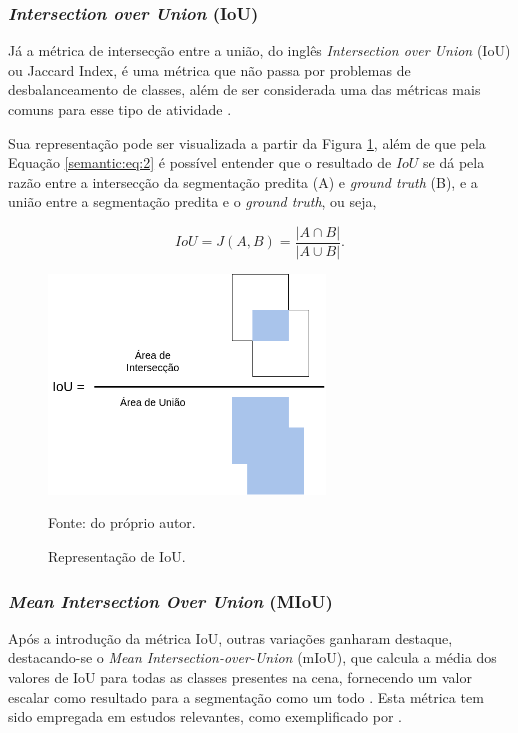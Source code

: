 \subsubsection{\textit{Intersection over Union} (IoU)}
\label{semantic:IoU}
Já a métrica de intersecção entre a união, do inglês \textit{Intersection over Union} (IoU) ou Jaccard Index, é uma métrica que não passa por problemas de desbalanceamento de classes, além de ser considerada uma das métricas mais comuns para esse tipo de atividade \citep{Minaee2021}.

Sua representação pode ser visualizada a partir da Figura \ref{semantic:fig:1}, além de que pela Equação \ref{semantic:eq:2} é possível entender que o resultado de $IoU$ se dá pela razão entre a intersecção da segmentação predita (A) e \textit{ground truth} (B), e a união entre a segmentação predita e o \textit{ground truth}, ou seja,

\begin{equation}
    \label{semantic:eq:2}
    IoU = J(A,B) = \frac{|A \cap B|}{|A \cup B|}.
\end{equation}

\begin{figure}[H]
    \centering
    \caption{Representação de IoU.}
    \includegraphics[height=2.3in]{recursos/imagens/semantic/IoU.png}
    \label{semantic:fig:1}

    Fonte: do próprio autor.
\end{figure}

\subsubsection{\textit{Mean Intersection Over Union} (MIoU)}
\label{semantic:miou}
Após a introdução da métrica IoU, outras variações ganharam destaque, destacando-se o \textit{Mean Intersection-over-Union} (mIoU), que calcula a média dos valores de IoU para todas as classes presentes na cena, fornecendo um valor escalar como resultado para a segmentação como um todo \citep{Minaee2021}. Esta métrica tem sido empregada em estudos relevantes, como exemplificado por \cite{Mohan2020}.

